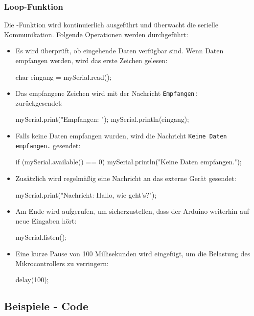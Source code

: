 \subsubsection{Loop-Funktion}
Die -Funktion wird kontinuierlich ausgeführt und überwacht die serielle Kommunikation. Folgende Operationen werden durchgeführt:

\begin{itemize}
	\item Es wird überprüft, ob eingehende Daten verfügbar sind. Wenn Daten empfangen werden, wird das erste Zeichen gelesen:
	\begin{Arduino}
		char eingang = mySerial.read();
	\end{Arduino}
	\item Das empfangene Zeichen wird mit der Nachricht \texttt{Empfangen: } zurückgesendet:
	\begin{Arduino}
		mySerial.print("Empfangen: ");
		mySerial.println(eingang);
	\end{Arduino}
	\item Falls keine Daten empfangen wurden, wird die Nachricht \texttt{Keine Daten empfangen.} gesendet:
	\begin{Arduino}
		if (mySerial.available() == 0) {
			mySerial.println("Keine Daten empfangen.");
		}
	\end{Arduino}
	\item Zusätzlich wird regelmäßig eine Nachricht an das externe Gerät gesendet:
	\begin{Arduino}
		mySerial.print("Nachricht: Hallo, wie geht's?");
	\end{Arduino}
	\item Am Ende wird  aufgerufen, um sicherzustellen, dass der Arduino weiterhin auf neue Eingaben hört:
	\begin{Arduino}
		mySerial.listen();
	\end{Arduino}
	\item Eine kurze Pause von 100 Millisekunden wird eingefügt, um die Belastung des Mikrocontrollers zu verringern:
	\begin{Arduino}
		delay(100);
	\end{Arduino}
\end{itemize}



\subsection{Beispiele - Code}

